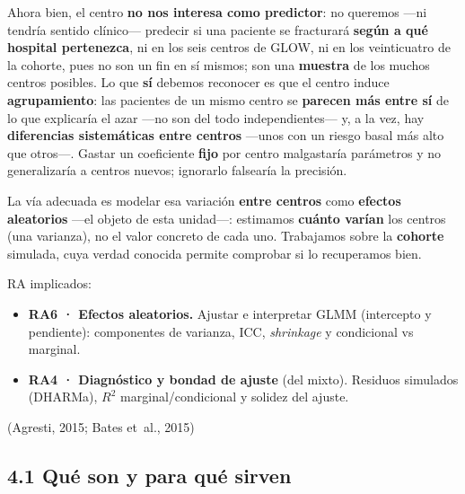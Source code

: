 \documentclass[
  letterpaper,
  DIV=11,
  numbers=noendperiod]{scrartcl}
\providecommand{\tightlist}{%
  \setlength{\itemsep}{0pt}\setlength{\parskip}{0pt}}\usepackage{longtable,booktabs,array}
\begin{document}
Ahora bien, el centro \textbf{no nos interesa como predictor}: no
queremos ---ni tendría sentido clínico--- predecir si una paciente se
fracturará \textbf{según a qué hospital pertenezca}, ni en los seis
centros de GLOW, ni en los veinticuatro de la cohorte, pues no son un
fin en sí mismos; son una \textbf{muestra} de los muchos centros
posibles. Lo que \textbf{sí} debemos reconocer es que el centro induce
\textbf{agrupamiento}: las pacientes de un mismo centro se
\textbf{parecen más entre sí} de lo que explicaría el azar ---no son del
todo independientes--- y, a la vez, hay \textbf{diferencias sistemáticas
entre centros} ---unos con un riesgo basal más alto que otros---. Gastar
un coeficiente \textbf{fijo} por centro malgastaría parámetros y no
generalizaría a centros nuevos; ignorarlo falsearía la precisión.

La vía adecuada es modelar esa variación \textbf{entre centros} como
\textbf{efectos aleatorios} ---el objeto de esta unidad---: estimamos
\textbf{cuánto varían} los centros (una varianza), no el valor concreto
de cada uno. Trabajamos sobre la \textbf{cohorte} simulada, cuya verdad
conocida permite comprobar si lo recuperamos bien.

\begin{tcolorbox}[enhanced jigsaw, coltitle=black, rightrule=.15mm, arc=.35mm, leftrule=.75mm, colback=white, colbacktitle=quarto-callout-note-color!10!white, left=2mm, breakable, toptitle=1mm, toprule=.15mm, bottomtitle=1mm, titlerule=0mm, title=\textcolor{quarto-callout-note-color}{\faInfo}\hspace{0.5em}{Sobre esta unidad}, bottomrule=.15mm, opacityback=0, opacitybacktitle=0.6, colframe=quarto-callout-note-color-frame]

RA implicados:

\begin{itemize}
\tightlist
\item
  \textbf{RA6 · Efectos aleatorios.} Ajustar e interpretar GLMM
  (intercepto y pendiente): componentes de varianza, ICC,
  \emph{shrinkage} y condicional vs marginal.
\item
  \textbf{RA4 · Diagnóstico y bondad de ajuste} (del mixto). Residuos
  simulados (DHARMa), \(R^2\) marginal/condicional y solidez del ajuste.
\end{itemize}

(Agresti, 2015; Bates et~al., 2015)

\end{tcolorbox}

\hypertarget{sec-u14-que-son}{%
\subsection{4.1 Qué son y para qué sirven}\label{sec-u14-que-son}}
\end{document}
